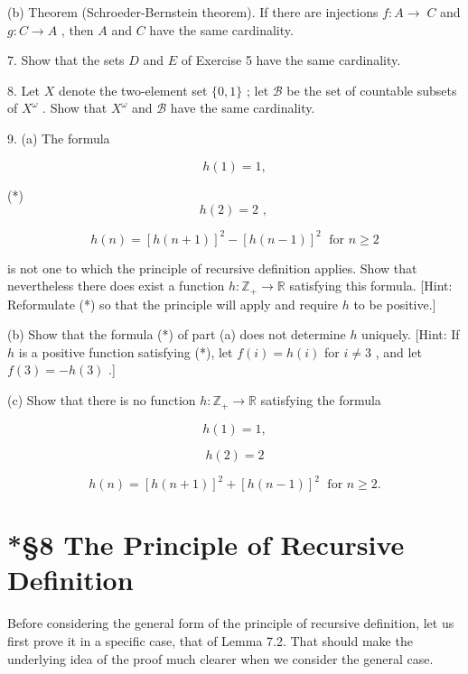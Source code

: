 \documentclass[10pt]{article}
\begin{document}
(b) Theorem (Schroeder-Bernstein theorem). If there are injections \(f : A \rightarrow \; C\) and \(g : C \rightarrow  A\) , then \(A\) and \(C\) have the same cardinality.

7. Show that the sets \(D\) and \(E\) of Exercise 5 have the same cardinality.

8. Let \(X\) denote the two-element set \(\{ 0,1\}\) ; let \(\mathcal{B}\) be the set of countable subsets of \({X}^{\omega }\) . Show that \({X}^{\omega }\) and \(\mathcal{B}\) have the same cardinality.

9. (a) The formula

\[
h\left( 1\right)  = 1,
\]

(*)
\[
h\left( 2\right)  = 2\text{ , }
\]

\[
h\left( n\right)  = {\left\lbrack  h\left( n + 1\right) \right\rbrack  }^{2} - {\left\lbrack  h\left( n - 1\right) \right\rbrack  }^{2}\;\text{ for }n \geq  2
\]

is not one to which the principle of recursive definition applies. Show that nevertheless there does exist a function \(h : {\mathbb{Z}}_{ + } \rightarrow  \mathbb{R}\) satisfying this formula. [Hint: Reformulate (*) so that the principle will apply and require \(h\) to be positive.]

(b) Show that the formula (*) of part (a) does not determine \(h\) uniquely. [Hint: If \(h\) is a positive function satisfying (*), let \(f\left( i\right)  = h\left( i\right)\) for \(i \neq  3\) , and let \(f\left( 3\right)  =  - h\left( 3\right)\) .]

(c) Show that there is no function \(h : {\mathbb{Z}}_{ + } \rightarrow  \mathbb{R}\) satisfying the formula

\[
h\left( 1\right)  = 1,
\]

\[
h\left( 2\right)  = 2
\]

\[
h\left( n\right)  = {\left\lbrack  h\left( n + 1\right) \right\rbrack  }^{2} + {\left\lbrack  h\left( n - 1\right) \right\rbrack  }^{2}\;\text{ for }n \geq  2.
\]

\section*{*§8 The Principle of Recursive Definition}

Before considering the general form of the principle of recursive definition, let us first prove it in a specific case, that of Lemma 7.2. That should make the underlying idea of the proof much clearer when we consider the general case.
\end{document}
